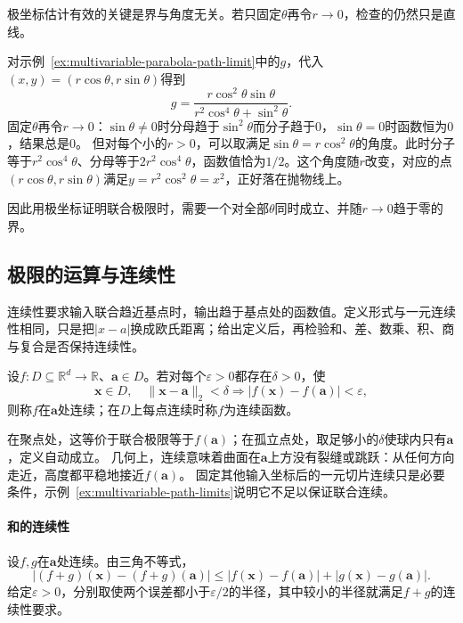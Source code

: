 极坐标估计有效的关键是界与角度无关。若只固定$\theta$再令$r\to0$，检查的仍然只是直线。
\begin{example}[固定角度的极坐标检验]
\label{ex:multivariable-polar-fixed-angle}
对示例~\ref{ex:multivariable-parabola-path-limit}中的$g$，代入$(x,y)=(r\cos\theta,r\sin\theta)$得到
\[
 g=\frac{r\cos^2\theta\sin\theta}{r^2\cos^4\theta+\sin^2\theta}.
\]
固定$\theta$再令$r\to0$：$\sin\theta\neq0$时分母趋于$\sin^2\theta$而分子趋于$0$，$\sin\theta=0$时函数恒为$0$，结果总是$0$。
但对每个小的$r>0$，可以取满足$\sin\theta=r\cos^2\theta$的角度。此时分子等于$r^2\cos^4\theta$、分母等于$2r^2\cos^4\theta$，函数值恰为$1/2$。这个角度随$r$改变，对应的点$(r\cos\theta,r\sin\theta)$满足$y=r^2\cos^2\theta=x^2$，正好落在抛物线上。
\end{example}

因此用极坐标证明联合极限时，需要一个对全部$\theta$同时成立、并随$r\to0$趋于零的界。

\subsection{极限的运算与连续性}
\label{sec:multivariable-continuity}

连续性要求输入联合趋近基点时，输出趋于基点处的函数值。定义形式与一元连续性相同，只是把$|x-a|$换成欧氏距离；给出定义后，再检验和、差、数乘、积、商与复合是否保持连续性。
\begin{definition}[多元标量函数的连续性]
\label{def:multivariable-scalar-continuity}
设$f:D\subseteq\mathbb R^d\to\mathbb R$、$\bm a\in D$。若对每个$\varepsilon>0$都存在$\delta>0$，使
\[
 \bm x\in D,\quad\lVert\bm x-\bm a\rVert_2<\delta
 \Longrightarrow |f(\bm x)-f(\bm a)|<\varepsilon,
\]
则称$f$在$\bm a$处连续；在$D$上每点连续时称$f$为连续函数。
\end{definition}
在聚点处，这等价于联合极限等于$f(\bm a)$；在孤立点处，取足够小的$\delta$使球内只有$\bm a$，定义自动成立。
几何上，连续意味着曲面在$\bm a$上方没有裂缝或跳跃：从任何方向走近，高度都平稳地接近$f(\bm a)$。
固定其他输入坐标后的一元切片连续只是必要条件，示例~\ref{ex:multivariable-path-limits}说明它不足以保证联合连续。

\paragraph{和的连续性}
设$f,g$在$\bm a$处连续。由三角不等式，
\[
 |(f+g)(\bm x)-(f+g)(\bm a)|\leq|f(\bm x)-f(\bm a)|+|g(\bm x)-g(\bm a)|.
\]
给定$\varepsilon>0$，分别取使两个误差都小于$\varepsilon/2$的半径，其中较小的半径就满足$f+g$的连续性要求。

